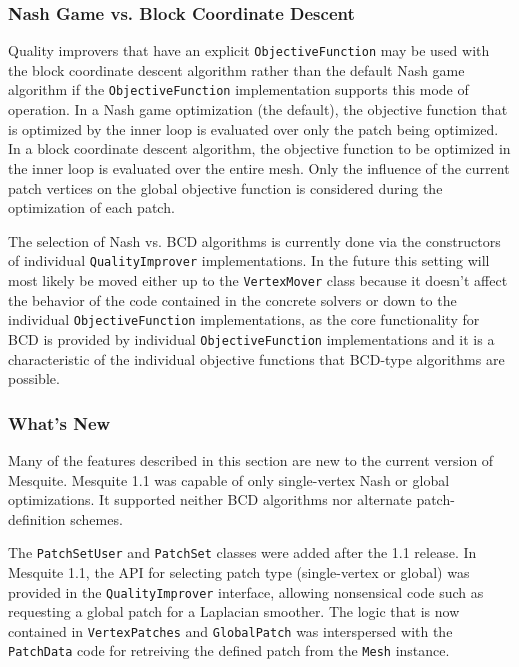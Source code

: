 \documentclass{article}
\begin{document}
\subsubsection{Nash Game vs. Block Coordinate Descent}

Quality improvers that have an explicit \texttt{ObjectiveFunction} may be used with the block coordinate descent algorithm rather than the default Nash game algorithm if the \texttt{ObjectiveFunction} implementation supports this mode of operation. In a Nash game optimization (the default), the objective function that is optimized by the inner loop is evaluated over only the patch being optimized.  In a block coordinate descent algorithm, the objective function to be optimized in the inner loop is evaluated over the entire mesh.  Only the influence of the current patch vertices on the global objective function is considered during the optimization of each patch.

The selection of Nash vs. BCD algorithms is currently done via the constructors of individual \texttt{QualityImprover} implementations.  In the future this setting will most likely be moved either up to the \texttt{VertexMover} class because it doesn't affect the behavior of the code contained in the concrete solvers or down to the individual \texttt{ObjectiveFunction} implementations, as the core functionality for BCD is provided by individual \texttt{ObjectiveFunction} implementations and it is a characteristic of the individual objective functions that BCD-type algorithms are possible.

\subsubsection{What's New}

Many of the features described in this section are new to the current version of Mesquite.  Mesquite 1.1 was capable of only single-vertex Nash or global optimizations.  It supported neither BCD algorithms nor alternate patch-definition schemes.

The \texttt{PatchSetUser} and \texttt{PatchSet} classes were added after the 1.1 release.  In Mesquite 1.1, the API for selecting patch type (single-vertex or global) was provided in the \texttt{QualityImprover} interface, allowing nonsensical code such as requesting a global patch for a Laplacian smoother.  The logic that is now contained in \texttt{VertexPatches} and \texttt{GlobalPatch} was interspersed with the \texttt{PatchData} code for retreiving the defined patch from the \texttt{Mesh} instance.
\end{document}
